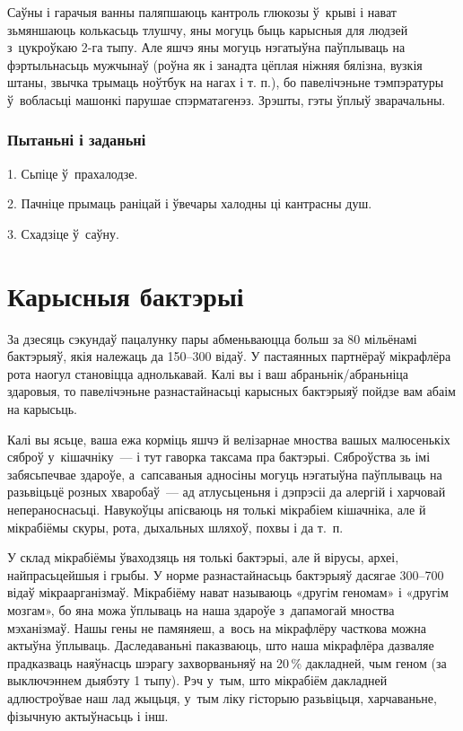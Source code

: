Саўны і гарачыя ванны паляпшаюць кантроль глюкозы ў~крыві і нават зьмяншаюць колькасьць тлушчу, яны могуць быць карысныя для людзей з~цукроўкаю 2-га тыпу. Але яшчэ яны могуць нэгатыўна паўплываць на фэртыльнасьць мужчынаў (роўна як і занадта цёплая ніжняя бялізна, вузкія штаны, звычка трымаць ноўтбук на нагах і т. п.), бо павелічэньне тэмпэратуры ў~вобласьці машонкі парушае спэрматагенэз. Зрэшты, гэты ўплыў зварачальны.

\subsubsection{Пытаньні і заданьні}

1. Сьпіце ў~прахалодзе.

2. Пачніце прымаць раніцай і ўвечары халодны ці кантрасны душ.

3. Схадзіце ў~саўну.


\section{Карысныя бактэрыі}

За дзесяць сэкундаў пацалунку пары абменьваюцца больш за 80 мільёнамі бактэрыяў, якія належаць да 150--300 відаў. У пастаянных партнёраў мікрафлёра рота наогул становіцца аднолькавай. Калі вы і ваш абраньнік/абраньніца здаровыя, то павелічэньне разнастайнасьці карысных бактэрыяў пойдзе вам абаім на карысьць.

Калі вы ясьце, ваша ежа корміць яшчэ й велізарнае мноства вашых малюсенькіх сяброў у~кішачніку~--- і тут гаворка таксама пра бактэрыі. Сяброўства зь імі забясьпечвае здароўе, а~сапсаваныя адносіны могуць нэгатыўна паўплываць на разьвіцьцё розных хваробаў~--- ад атлусьценьня і дэпрэсіі да алергій і харчовай непераноснасьці. Навукоўцы апісваюць ня толькі мікрабіем кішачніка, але й мікрабіёмы скуры, рота, дыхальных шляхоў, похвы і да т.~п.

У склад мікрабіёмы ўваходзяць ня толькі бактэрыі, але й вірусы, археі, найпрасьцейшыя і грыбы. У норме разнастайнасьць бактэрыяў дасягае 300--700 відаў мікраарганізмаў. Мікрабіёму нават называюць «другім геномам» і «другім мозгам», бо яна можа ўплываць на наша здароўе з~дапамогай мноства мэханізмаў. Нашы гены не памяняеш, а~вось на мікрафлёру часткова можна актыўна ўплываць. Даследаваньні паказваюць, што наша мікрафлёра дазваляе прадказваць наяўнасць шэрагу захворваньняў на 20\,\% дакладней, чым геном (за выключэннем дыябэту 1 тыпу). Рэч у~тым, што мікрабіём дакладней адлюстроўвае наш лад жыцьця, у~тым ліку гісторыю разьвіцьця, харчаваньне, фізычную актыўнасьць і інш.

